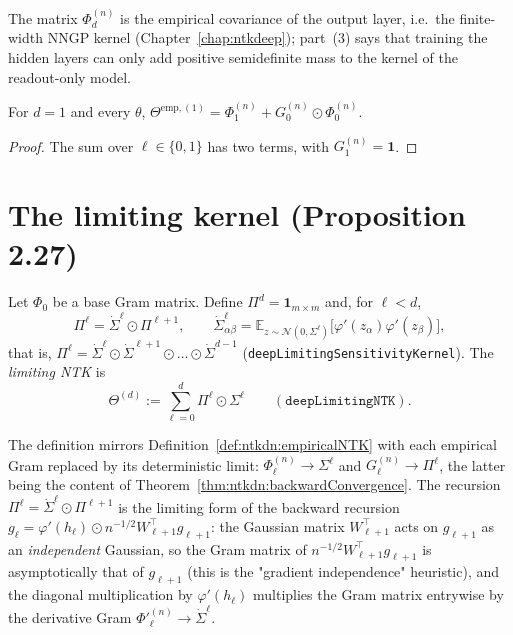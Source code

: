 The matrix $\Phi_d^{(n)}$ is the empirical covariance of the output layer, i.e.\ the finite-width NNGP kernel (Chapter~\ref{chap:ntkdeep}); part~(3) says that training the hidden layers can only add positive semidefinite mass to the kernel of the readout-only model.

\begin{theorem}\label{thm:ntkdn:twoLayerEmpirical}
  \leanok
For $d=1$ and every $\theta$, $\Theta^{\mathrm{emp},(1)}=\Phi_1^{(n)}+G_0^{(n)}\odot\Phi_0^{(n)}$.
\end{theorem}

\begin{proof}
  \leanok
The sum over $\ell\in\{0,1\}$ has two terms, with $G_1^{(n)}=\mathbf 1$.
\end{proof}


\section{The limiting kernel (Proposition 2.27)}\label{sec:ntkdn:limit}

\begin{definition}\label{def:ntkdn:limitingNTK}
  \leanok
Let $\Phi_0$ be a base Gram matrix. Define $\Pi^d=\mathbf 1_{m\times m}$ and, for $\ell<d$,
\[
  \Pi^\ell=\dot\Sigma^\ell\odot\Pi^{\ell+1},\qquad\dot\Sigma^\ell_{\alpha\beta}=\mathbb E_{z\sim\mathcal N(0,\Sigma^\ell)}\bigl[\varphi'(z_\alpha)\varphi'(z_\beta)\bigr],
\]
that is, $\Pi^\ell=\dot\Sigma^\ell\odot\dot\Sigma^{\ell+1}\odot\dots\odot\dot\Sigma^{d-1}$ (\texttt{deepLimitingSensitivityKernel}). The \emph{limiting NTK} is
\[
  \Theta^{(d)}:=\sum_{\ell=0}^d\Pi^\ell\odot\Sigma^\ell\qquad(\texttt{deepLimitingNTK}).
\]
\end{definition}

The definition mirrors Definition~\ref{def:ntkdn:empiricalNTK} with each empirical Gram replaced by its deterministic limit: $\Phi_\ell^{(n)}\to\Sigma^\ell$ and $G_\ell^{(n)}\to\Pi^\ell$, the latter being the content of Theorem~\ref{thm:ntkdn:backwardConvergence}. The recursion $\Pi^\ell=\dot\Sigma^\ell\odot\Pi^{\ell+1}$ is the limiting form of the backward recursion $g_\ell=\varphi'(h_\ell)\odot n^{-1/2}W_{\ell+1}^\top g_{\ell+1}$: the Gaussian matrix $W_{\ell+1}^\top$ acts on $g_{\ell+1}$ as an \emph{independent} Gaussian, so the Gram matrix of $n^{-1/2}W_{\ell+1}^\top g_{\ell+1}$ is asymptotically that of $g_{\ell+1}$ (this is the "gradient independence" heuristic), and the diagonal multiplication by $\varphi'(h_\ell)$ multiplies the Gram matrix entrywise by the derivative Gram $\Phi'^{(n)}_\ell\to\dot\Sigma^\ell$.

